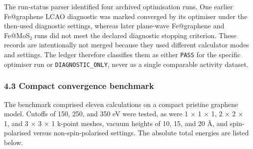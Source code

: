 \documentclass[
]{article}
\begin{document}
The run-status parser identified four archived optimisation runs. One
earlier Fe@graphene LCAO diagnostic was marked converged by its
optimiser under the then-used diagnostic settings, whereas later
plane-wave Fe@graphene and Fe@MoS₂ runs did not meet the declared
diagnostic stopping criterion. These records are intentionally not
merged because they used different calculator modes and settings. The
ledger therefore classifies them as either \texttt{PASS} for the
specific optimiser run or \texttt{DIAGNOSTIC\_ONLY}, never as a single
comparable activity dataset.

\hypertarget{compact-convergence-benchmark}{%
\subsubsection{4.3 Compact convergence
benchmark}\label{compact-convergence-benchmark}}

The benchmark comprised eleven calculations on a compact pristine
graphene model. Cutoffs of 150, 250, and 350 eV were tested, as were 1 ×
1 × 1, 2 × 2 × 1, and 3 × 3 × 1 k-point meshes, vacuum heights of 10,
15, and 20 Å, and spin-polarised versus non-spin-polarised settings. The
absolute total energies are listed below.
\end{document}

